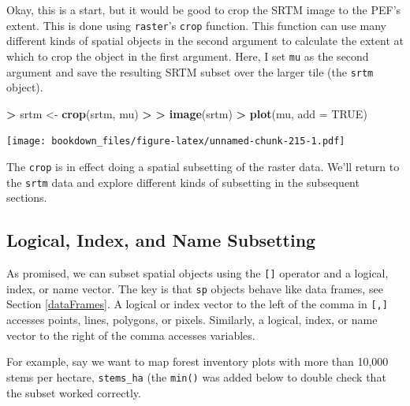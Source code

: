 \documentclass[
]{krantz}
\makeatletter
\newenvironment{Shaded}{\begin{snugshade}}{\end{snugshade}}
\newcommand{\DataTypeTok}[1]{\textcolor[rgb]{0.27,0.27,0.27}{#1}}
\newcommand{\ErrorTok}[1]{\textcolor[rgb]{0.14,0.14,0.14}{\textbf{#1}}}
\newcommand{\KeywordTok}[1]{\textcolor[rgb]{0.27,0.27,0.27}{\textbf{#1}}}
\newcommand{\NormalTok}[1]{#1}
\newcommand{\OperatorTok}[1]{\textcolor[rgb]{0.43,0.43,0.43}{\textbf{#1}}}
\newcommand{\OtherTok}[1]{\textcolor[rgb]{0.37,0.37,0.37}{#1}}
\newcommand{\StringTok}[1]{\textcolor[rgb]{0.5,0.5,0.5}{#1}}
\newenvironment{kframe}{%
\medskip{}
\setlength{\fboxsep}{.8em}
 \def\at@end@of@kframe{}%
 \ifinner\ifhmode%
  \def\at@end@of@kframe{\end{minipage}}%
  \begin{minipage}{\columnwidth}%
 \fi\fi%
 \def\FrameCommand##1{\hskip\@totalleftmargin \hskip-\fboxsep
 \colorbox{shadecolor}{##1}\hskip-\fboxsep
     \hskip-\linewidth \hskip-\@totalleftmargin \hskip\columnwidth}%
 \MakeFramed {\advance\hsize-\width
   \@totalleftmargin\z@ \linewidth\hsize
   \@setminipage}}%
 {\par\unskip\endMakeFramed%
 \at@end@of@kframe}
\renewenvironment{Shaded}{\begin{kframe}}{\end{kframe}}
\makeatother
\begin{document}
Okay, this is a start, but it would be good to crop the SRTM image to the PEF's extent. This is done using \texttt{raster}'s \texttt{crop} function. This function can use many different kinds of spatial objects in the second argument to calculate the extent at which to crop the object in the first argument. Here, I set \texttt{mu} as the second argument and save the resulting SRTM subset over the larger tile (the \texttt{srtm} object).

\begin{Shaded}
\begin{Highlighting}[]
\OperatorTok{\textgreater{}}\StringTok{ }\NormalTok{srtm \textless{}{-}}\StringTok{ }\KeywordTok{crop}\NormalTok{(srtm, mu)}
\OperatorTok{\textgreater{}}\StringTok{ }
\ErrorTok{\textgreater{}}\StringTok{ }\KeywordTok{image}\NormalTok{(srtm)}
\OperatorTok{\textgreater{}}\StringTok{ }\KeywordTok{plot}\NormalTok{(mu, }\DataTypeTok{add =} \OtherTok{TRUE}\NormalTok{)}
\end{Highlighting}
\end{Shaded}

\texttt{[image: bookdown\_files/figure-latex/unnamed-chunk-215-1.pdf]}

The \texttt{crop} is in effect doing a spatial subsetting of the raster data. We'll return to the \texttt{srtm} data and explore different kinds of subsetting in the subsequent sections.

\hypertarget{logical-index-and-name-subsetting}{%
\subsection{Logical, Index, and Name Subsetting}\label{logical-index-and-name-subsetting}}

As promised, we can subset spatial objects using the \texttt{{[}{]}} operator and a logical, index, or name vector. The key is that \texttt{sp} objects behave like data frames, see Section \ref{dataFrames}. A logical or index vector to the left of the comma in \texttt{{[},{]}} accesses points, lines, polygons, or pixels. Similarly, a logical, index, or name vector to the right of the comma accesses variables.

For example, say we want to map forest inventory plots with more than 10,000 stems per hectare, \texttt{stems\_ha} (the \texttt{min()} was added below to double check that the subset worked correctly.

\begin{Shaded}
\end{Shaded}
\end{document}
